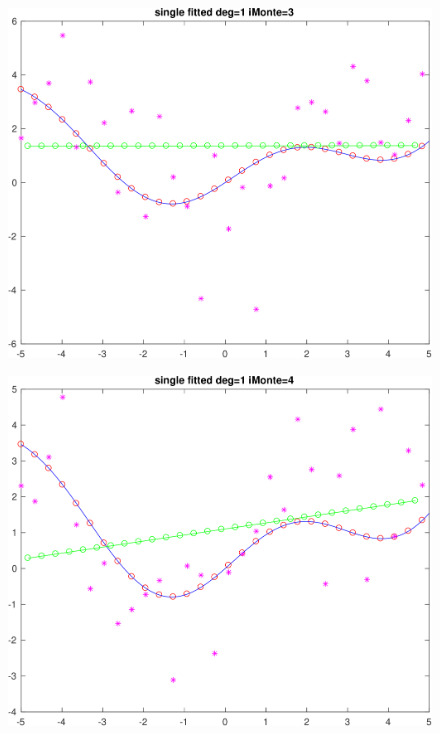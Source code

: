 \begin{figure}[h!]
\centering\includegraphics[scale=0.1]{single_poly_d_1_iMonte_3.png}
\end{figure}

\begin{figure}[h!]
\centering\includegraphics[scale=0.1]{single_poly_d_1_iMonte_4.png}
\end{figure}


